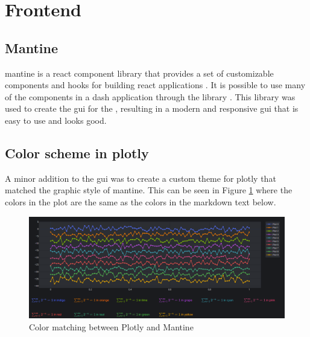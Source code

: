 \section{Frontend}
\subsection{Mantine}
\gls{mantine} is a \gls{react} component library that provides a set of customizable components and hooks for building \gls{react} applications \cite{rtishchevMantine}.
It is possible to use many of the components in a \gls{dash} application through the  library \cite{vijayDashMantineComponents}.
This library was used to create the \gls{gui} for the \sr, resulting in a modern and responsive \gls{gui} that is easy to use and looks good.

\subsection{Color scheme in plotly}
A minor addition to the \gls{gui} was to create a custom theme for \gls{plotly} that matched the graphic style of \gls{mantine}.
This can be seen in Figure \ref{fig:color_matching} where the colors in the plot are the same as the colors in the \gls{markdown} text below.

\begin{figure}[H]
    \centering
    \includegraphics[width=\textwidth]{figures/gui/colors.png}
    \caption{Color matching between Plotly and Mantine}
    \label{fig:color_matching}
\end{figure}